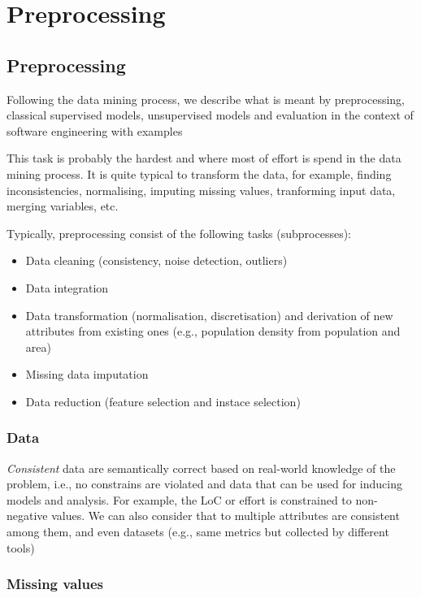 \documentclass[]{book}
\providecommand{\tightlist}{%
  \setlength{\itemsep}{0pt}\setlength{\parskip}{0pt}}
\begin{document}
\part{Preprocessing}\label{part-preprocessing}

\chapter{Preprocessing}\label{preprocessing}

Following the data mining process, we describe what is meant by
preprocessing, classical supervised models, unsupervised models and
evaluation in the context of software engineering with examples

This task is probably the hardest and where most of effort is spend in
the data mining process. It is quite typical to transform the data, for
example, finding inconsistencies, normalising, imputing missing values,
tranforming input data, merging variables, etc.

Typically, preprocessing consist of the following tasks (subprocesses):

\begin{itemize}
\tightlist
\item
  Data cleaning (consistency, noise detection, outliers)
\item
  Data integration
\item
  Data transformation (normalisation, discretisation) and derivation of
  new attributes from existing ones (e.g., population density from
  population and area)
\item
  Missing data imputation
\item
  Data reduction (feature selection and instace selection)
\end{itemize}

\section{Data}\label{data}

\emph{Consistent} data are semantically correct based on real-world
knowledge of the problem, i.e., no constrains are violated and data that
can be used for inducing models and analysis. For example, the LoC or
effort is constrained to non-negative values. We can also consider that
to multiple attributes are consistent among them, and even datasets
(e.g., same metrics but collected by different tools)

\section{Missing values}\label{missing-values}
\end{document}
